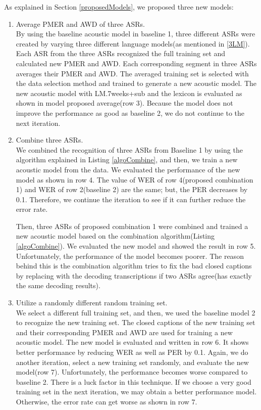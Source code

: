 As explained in Section \ref{proposedModels}, we proposed three new models:
\begin{enumerate}
\item Average PMER and AWD of three ASRs.  \\
By using the baseline acoustic model in baseline 1, three different ASRs were created by varying three different language models(as mentioned in \ref{3LM}). Each ASR from the three ASRs recognized the full training set and calculated new PMER and AWD. Each corresponding segment in three ASRs averages their PMER and AWD. The averaged training set is selected with the data selection method and trained to generate a new acoustic model. The new acoustic model with LM.7weeks+sub and the lexicon is evaluated as shown in model proposed average(row 3). Because the model does not improve the performance as good as baseline 2, we do not continue to the next iteration.

\item Combine three ASRs.  \\
We combined the recognition of three ASRs from Baseline 1 by using the algorithm explained in Listing \ref{algoCombine}, and then, we train a new acoustic model from the data. We evaluated the performance of the new model as shown in row 4. The value of WER of row 4(proposed combination 1) and WER of row 2(baseline 2) are the same; but, the PER decreases by 0.1. Therefore, we continue the iteration to see if it can further reduce the error rate.

Then, three ASRs of proposed combination 1 were combined and trained a new acoustic model based on the combination algorithm(Listing \ref{algoCombine}). We evaluated the new model and showed the result in row 5. Unfortunately, the performance of the model becomes poorer. The reason behind this is the combination algorithm tries to fix the bad closed captions by replacing with the decoding transcriptions if two ASRs agree(has exactly the same decoding results).

\item Utilize a randomly different random training set.  \\
We select a different full training set, and then, we used the baseline model 2 to recognize the new training set. The closed captions of the new training set and their corresponding PMER and AWD are used for training a new acoustic model. The new model is evaluated and written in row 6. It shows better performance by reducing WER as well as PER by 0.1. Again, we do another iteration, select a new training set randomly, and evaluate the new model(row 7). Unfortunately, the performance becomes worse compared to baseline 2. There is a luck factor in this technique. If we choose a very good training set in the next iteration, we may obtain a better performance model. Otherwise, the error rate can get worse as shown in row 7.

\end{enumerate} 

